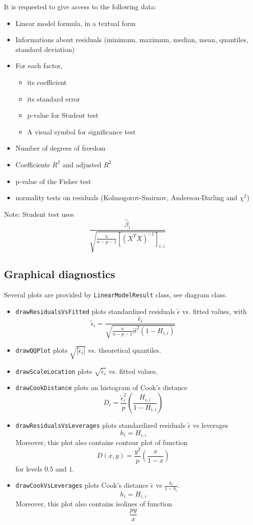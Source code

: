 It is requested to give access to the following data:
\begin{itemize}
\item Linear model formula, in a textual form
\item Informations about residuals (minimum, maximum, median, mean, quantiles, standard deviation)
\item For each factor,
\begin{itemize}
\item its coefficient
\item its standard error
\item p-value for Student test
\item A visual symbol for significance test
\end{itemize}
\item Number of degrees of freedom
\item Coefficients $R^2$ and adjusted $R^2$
\item p-value of the Fisher test
\item normality tests on residuals (Kolmogorov-Smirnov, Anderson-Darling and $\chi^2$)
\end{itemize}

Note: Student test uses
\[
\frac{\hat{\beta}_i}{\sqrt{\frac{n}{n-p-1}\left[(X^T X)^{-1}\right]_{i,i}}}
\]

\subsection{Graphical diagnostics}

Several plots are provided by \texttt{LinearModelResult} class, see diagram class.
\begin{itemize}
\item \texttt{drawResidualsVsFitted} plots standardized residuals $\tilde{\epsilon}$ vs. fitted values, with
\[
\tilde{\epsilon}_i = \frac{\hat{\epsilon}_i}{\sqrt{\frac{n}{n-p-1}\hat{\sigma}^2 (1-H_{i,i})}}
\]
\item \texttt{drawQQPlot} plots $\sqrt{|\tilde{\epsilon}_i|}$ vs. theoretical quantiles.
\item \texttt{drawScaleLocation} plots $\sqrt{\tilde{\epsilon}_i}$ vs. fitted values.
\item \texttt{drawCookDistance} plots an histogram of Cook's distance
\[
D_i = \frac{\tilde{\epsilon}_i^2}{p} \left(\frac{H_{i,i}}{1-H_{i,i}}\right)
\]
\item \texttt{drawResidualsVsLeverages} plots standardized residuals $\tilde{\epsilon}$ vs leverages
\[
h_i = H_{i,i}
\]
Moreover, this plot also contains contour plot of function
\[
D(x,y) = \frac{y^2}{p}\left(\frac{x}{1-x}\right)
\]
for levels $0.5$ and $1$.
\item \texttt{drawCookVsLeverages} plots Cook's distance $\tilde{\epsilon}$ vs $\frac{h_i}{1-h_i}$.
\[
h_i = H_{i,i}
\]
Moreover, this plot also contains isolines of function
\[
\frac{py}{x}
\]
\end{itemize}

